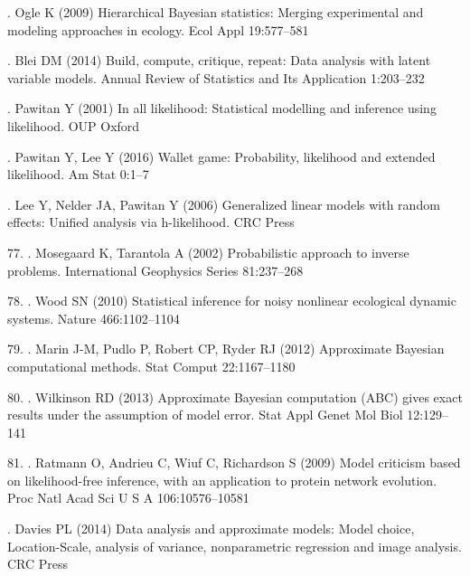 \documentclass[10pt,letterpaper]{article}
\providecommand{\DIFaddtex}[1]{{\protect\color{blue} \sf #1}} %
\providecommand{\DIFdeltex}[1]{{\protect\color{red} \scriptsize #1}} %
\providecommand{\DIFaddbegin}{} %
\providecommand{\DIFaddend}{} %
\providecommand{\DIFdelbegin}{} %
\providecommand{\DIFdelend}{} %
\providecommand{\DIFadd}[1]{\texorpdfstring{\DIFaddtex{#1}}{#1}} %
\providecommand{\DIFdel}[1]{\texorpdfstring{\DIFdeltex{#1}}{}} %
\begin{document}
\hypertarget{ref-Ogle2009-cb}{}
\DIFadd{67. Ogle K (2009) Hierarchical Bayesian statistics: Merging experimental
and modeling approaches in ecology. Ecol Appl 19:577--581
}

\hypertarget{ref-Blei2014-dh}{}
\DIFadd{68. Blei DM (2014) Build, compute, critique, repeat: Data analysis with
latent variable models. Annual Review of Statistics and Its Application
1:203--232
}

\hypertarget{ref-Pawitan2001-xm}{}
\DIFadd{69. Pawitan Y (2001) In all likelihood: Statistical modelling and
inference using likelihood. OUP Oxford
}

\hypertarget{ref-Pawitan2016-cz}{}
\DIFadd{70. Pawitan Y, Lee Y (2016) Wallet game: Probability, likelihood and
extended likelihood. Am Stat 0:1--7
}

\hypertarget{ref-Lee2006-mr}{}
\DIFadd{71. Lee Y, Nelder JA, Pawitan Y (2006) Generalized linear models with
random effects: Unified analysis via h-likelihood. CRC Press
}

\DIFaddend \hypertarget{ref-Mosegaard2002-lx}{}
\DIFdelbegin \DIFdel{77. }\DIFdelend \DIFaddbegin \DIFadd{72. }\DIFaddend Mosegaard K, Tarantola A (2002) Probabilistic approach to inverse
problems. International Geophysics Series 81:237--268

\hypertarget{ref-Wood2010-hp}{}
\DIFdelbegin \DIFdel{78. }\DIFdelend \DIFaddbegin \DIFadd{73. }\DIFaddend Wood SN (2010) Statistical inference for noisy nonlinear ecological
dynamic systems. Nature 466:1102--1104

\hypertarget{ref-Marin2012-fd}{}
\DIFdelbegin \DIFdel{79. }\DIFdelend \DIFaddbegin \DIFadd{74. }\DIFaddend Marin J-M, Pudlo P, Robert CP, Ryder RJ (2012) Approximate Bayesian
computational methods. Stat Comput 22:1167--1180

\hypertarget{ref-Wilkinson2013-rs}{}
\DIFdelbegin \DIFdel{80. }\DIFdelend \DIFaddbegin \DIFadd{75. }\DIFaddend Wilkinson RD (2013) Approximate Bayesian computation (ABC) gives
exact results under the assumption of model error. Stat Appl Genet Mol
Biol 12:129--141

\hypertarget{ref-Ratmann2009-de}{}
\DIFdelbegin \DIFdel{81. }\DIFdelend \DIFaddbegin \DIFadd{76. }\DIFaddend Ratmann O, Andrieu C, Wiuf C, Richardson S (2009) Model criticism
based on likelihood-free inference, with an application to protein
network evolution. Proc Natl Acad Sci U S A 106:10576--10581
\DIFaddbegin 

\hypertarget{ref-Davies2014-dz}{}
\DIFadd{77. Davies PL (2014) Data analysis and approximate models: Model choice,
Location-Scale, analysis of variance, nonparametric regression and image
analysis. CRC Press
}\DIFaddend 
\end{document}
